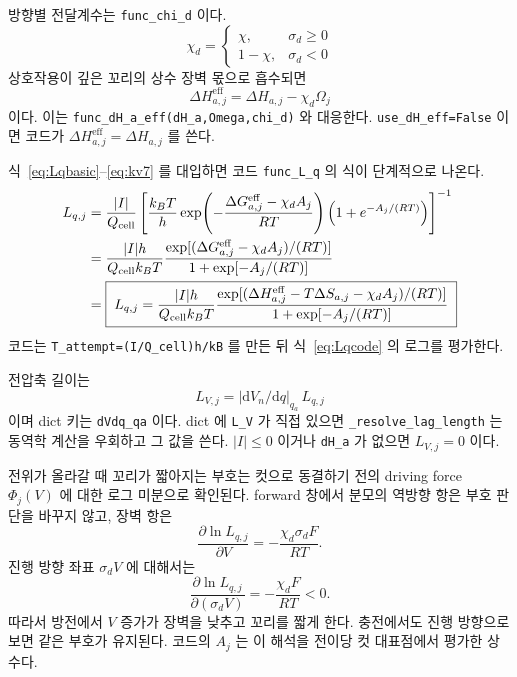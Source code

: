 \documentclass[11pt,a4paper]{article}
\newcommand{\dd}{\mathrm{d}}
\newcommand{\cell}{\mathrm{cell}}
\newcommand{\eff}{\mathrm{eff}}
\begin{document}
방향별 전달계수는 \texttt{func\_chi\_d} 이다.
\begin{equation}
\boxed{\;\chi_d=
\begin{cases}
\chi,&\sigma_d\ge0\\
1-\chi,&\sigma_d<0
\end{cases}\;}
\label{eq:chid}
\end{equation}
상호작용이 깊은 꼬리의 상수 장벽 몫으로 흡수되면
\begin{equation}
\boxed{\;\Delta H_{a,j}^{\eff}=\Delta H_{a,j}-\chi_d\Omega_j\;}
\label{eq:dHaeff}
\end{equation}
이다. 이는 \texttt{func\_dH\_a\_eff(dH\_a,Omega,chi\_d)} 와 대응한다. \texttt{use\_dH\_eff=False} 이면 코드가 $\Delta H_{a,j}^{\eff}=\Delta H_{a,j}$ 를 쓴다.

식~\eqref{eq:Lqbasic}--\eqref{eq:kv7} 를 대입하면 코드 \texttt{func\_L\_q} 의 식이 단계적으로 나온다.
\begin{align}
L_{q,j}
&=\frac{|I|}{Q_\cell}
\left[
\frac{k_BT}{h}
\exp\!\left(-\frac{\Delta G_{a,j}^{\eff}-\chi_dA_j}{RT}\right)
\left(1+e^{-A_j/(RT)}\right)
\right]^{-1}\notag\\
&=\frac{|I|h}{Q_\cell k_BT}
\frac{\exp[(\Delta G_{a,j}^{\eff}-\chi_dA_j)/(RT)]}
{1+\exp[-A_j/(RT)]}\notag\\
&=
\boxed{\;L_{q,j}=
\frac{|I|h}{Q_\cell k_BT}
\frac{\exp[(\Delta H_{a,j}^{\eff}-T\Delta S_{a,j}-\chi_d A_j)/(RT)]}
{1+\exp[-A_j/(RT)]}\;}
\label{eq:Lqcode}
\end{align}
코드는 \texttt{T\_attempt=(I/Q\_cell)h/kB} 를 만든 뒤 식~\eqref{eq:Lqcode} 의 로그를 평가한다.

전압축 길이는
\begin{equation}
\boxed{\;L_{V,j}=|\dd V_n/\dd q|_{q_a}\,L_{q,j}\;}
\label{eq:LV}
\end{equation}
이며 dict 키는 \texttt{dVdq\_qa} 이다. dict 에 \texttt{L\_V} 가 직접 있으면 \texttt{\_resolve\_lag\_length} 는 동역학 계산을 우회하고 그 값을 쓴다. $|I|\le0$ 이거나 \texttt{dH\_a} 가 없으면 $L_{V,j}=0$ 이다.

전위가 올라갈 때 꼬리가 짧아지는 부호는 컷으로 동결하기 전의 driving force $\Phi_j(V)$ 에 대한 로그 미분으로 확인된다. forward 창에서 분모의 역방향 항은 부호 판단을 바꾸지 않고, 장벽 항은
\begin{equation}
\frac{\partial\ln L_{q,j}}{\partial V}
=-\frac{\chi_d\sigma_dF}{RT}.
\label{eq:dlnLdVraw}
\end{equation}
진행 방향 좌표 $\sigma_dV$ 에 대해서는
\begin{equation}
\frac{\partial\ln L_{q,j}}{\partial(\sigma_dV)}
=-\frac{\chi_dF}{RT}<0.
\label{eq:dlnLdV}
\end{equation}
따라서 방전에서 $V$ 증가가 장벽을 낮추고 꼬리를 짧게 한다. 충전에서도 진행 방향으로 보면 같은 부호가 유지된다. 코드의 $A_j$ 는 이 해석을 전이당 컷 대표점에서 평가한 상수다.
\end{document}
